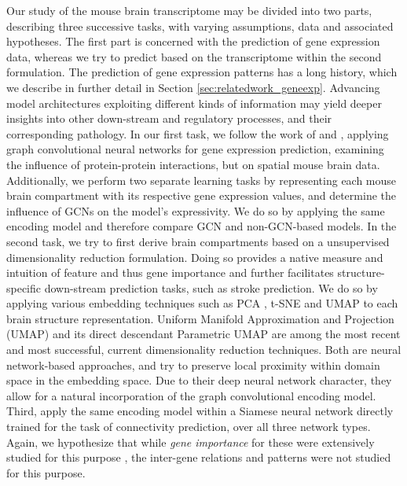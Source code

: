 \documentclass[]{article}
\renewcommand{\cite}{\citep}
\begin{document}
Our study of the mouse brain transcriptome may be divided into two parts, describing three successive tasks, with varying assumptions, data and associated hypotheses. 
The first part is concerned with the prediction of gene expression data, whereas we try to predict based on the transcriptome within the second formulation. 
The prediction of gene expression patterns has a long history, which we describe in further detail in Section \ref{sec:relatedwork_geneexp}. Advancing model architectures exploiting different kinds of information may yield deeper insights into other down-stream and regulatory processes, and their corresponding pathology. In our first task, we follow the work of \citet{wang2021mogonet} and \citet{schulte2021integration}, applying graph convolutional neural networks for gene expression prediction, examining the influence of protein-protein interactions, but on spatial mouse brain data.\\

Additionally, we perform two separate learning tasks by representing each mouse brain compartment with its respective gene expression values, and determine the influence of GCNs on the model's expressivity. We do so by applying the same encoding model and therefore compare GCN and non-GCN-based models.
In the second task, we try to first derive brain compartments based on a unsupervised dimensionality reduction formulation. Doing so provides a native measure and intuition of feature and thus gene importance and further facilitates structure-specific down-stream prediction tasks, such as stroke prediction.
We do so by applying various embedding techniques such as PCA \cite{wold1987principal}, t-SNE \cite{van2008visualizing} and UMAP  \cite{mcinnes2018umap} to each brain structure representation. Uniform Manifold Approximation and Projection (UMAP) and its direct descendant Parametric UMAP \cite{sainburg2021parametric} are among the most recent and most successful, current dimensionality reduction techniques. Both are neural network-based approaches, and try to preserve local proximity within domain space in the embedding space. Due to their deep neural network character, they allow for a natural incorporation of the graph convolutional encoding model. 
Third, apply the same encoding model within a Siamese neural network directly trained for the task of connectivity prediction, over all three network types. Again, we hypothesize that while \textit{gene importance} for these were extensively studied for this purpose \cite{bohland2010clustering, ValkShapingBrainStructure2020, takata_flexible_2021, friston2011functional}, the inter-gene relations and patterns were not studied for this purpose.\\
\end{document}
